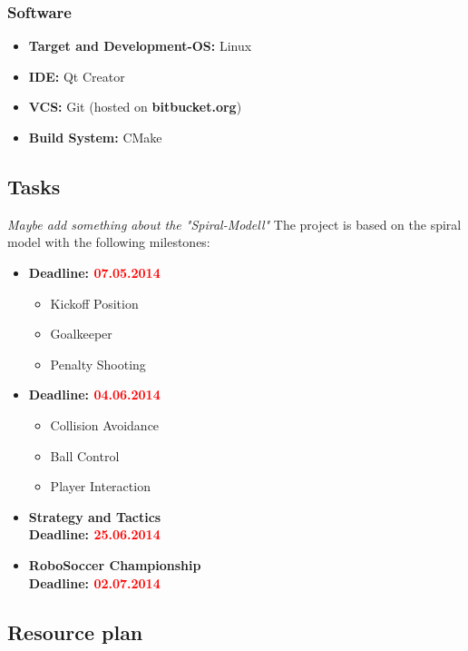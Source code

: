 \documentclass[12pt]{article}
\begin{document}
\subsubsection*{Software}
\begin{itemize}
	\item \textbf{Target and Development-OS:} Linux
	\item \textbf{IDE:} Qt Creator
	\item \textbf{VCS:} Git (hosted on \textbf{bitbucket.org})
	\item \textbf{Build System:} CMake
\end{itemize}

\subsection{Tasks}
\textit{Maybe add something about the "Spiral-Modell"}
The project is based on the spiral model with the following milestones:
\begin{itemize}
	\item \textbf{Deadline: \textcolor{red}{07.05.2014}}
	\begin{itemize}
		\item Kickoff Position
		\item Goalkeeper
		\item Penalty Shooting
	\end{itemize}
	
	\item \textbf{Deadline: \textcolor{red}{04.06.2014}}
	\begin{itemize}
		\item Collision Avoidance
		\item Ball Control
		\item Player Interaction
	\end{itemize}
	
	\item \textbf{Strategy and Tactics}\\
	\textbf{Deadline: \textcolor{red}{25.06.2014}}
	
	\item \textbf{RoboSoccer Championship}\\
	\textbf{Deadline: \textcolor{red}{02.07.2014}}
\end{itemize}

\subsection{Resource plan}
\end{document}
